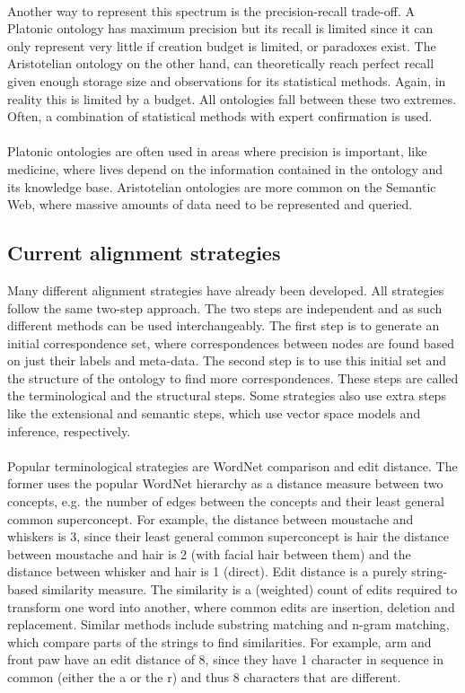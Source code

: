 \documentclass{article}
\begin{document}
 \paragraph{}
 Another way to represent this spectrum is the precision-recall trade-off. A Platonic ontology has maximum precision but its recall is limited since it can only represent very little if creation budget is limited, or paradoxes exist. The Aristotelian ontology on the other hand, can theoretically reach perfect recall given enough storage size and observations for its statistical methods. Again, in reality this is limited by a budget. All ontologies fall between these two extremes. Often, a combination of statistical methods with expert confirmation is used.
 \paragraph{}
 Platonic ontologies are often used in areas where precision is important, like medicine, where lives depend on the information contained in the ontology and its knowledge base. Aristotelian ontologies are more common on the Semantic Web, where massive amounts of data need to be represented and queried.
 
 \subsection{Current alignment strategies} \label{strategies}
 Many different alignment strategies have already been developed. All strategies follow the same two-step approach. The two steps are independent and as such different methods can be used interchangeably. The first step is to generate an initial correspondence set, where correspondences between nodes are found based on just their labels and meta-data. The second step is to use this initial set and the structure of the ontology to find more correspondences. These steps are called the terminological and the structural steps. Some strategies also use extra steps like the extensional and semantic steps, which use vector space models and inference, respectively\cite{future}.
 \paragraph{}
 Popular terminological strategies are WordNet comparison and edit distance. The former uses the popular WordNet hierarchy as a distance measure between two concepts, e.g. the number of edges between the concepts and their least general common superconcept\cite{lin2008}.
 For example, the distance between moustache and whiskers is 3, since their least general common superconcept is hair the distance between moustache and hair is 2 (with facial hair between them) and the distance between whisker and hair is 1 (direct).
 Edit distance is a purely string-based similarity measure. The similarity is a (weighted) count of edits required to transform one word into another, where common edits are insertion, deletion and replacement. Similar methods include substring matching and n-gram matching, which compare parts of the strings to find similarities\cite{singh2014, levenshtein}.
 For example, arm and front paw have an edit distance of 8, since they have 1 character in sequence in common (either the a or the r) and thus 8 characters that are different.
\end{document}
